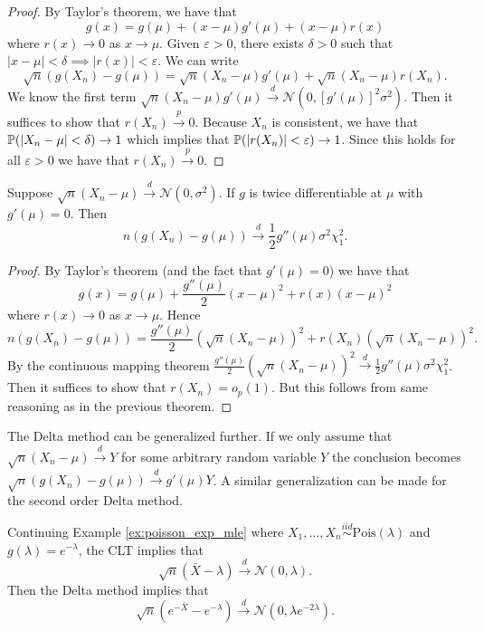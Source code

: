 \begin{proof}
	By Taylor's theorem, we have that \[
	g(x) = g(\mu) + (x - \mu)g'(\mu) + (x - \mu)r(x)
	\] where $r(x) \to 0$ as $x \to \mu$. Given $\varepsilon > 0$, there exists $\delta > 0$ such that $|x - \mu| < \delta \implies |r(x)| < \varepsilon$. We can write \[
	\sqrt{n}(g(X_n) - g(\mu)) = \sqrt{n}(X_n - \mu)g'(\mu) + \sqrt{n}(X_n - \mu)r(X_n).
	\] We know the first term $\sqrt{n}(X_n - \mu)g'(\mu) \overset{d}{\to} \mathcal{N}(0, [g'(\mu)]^2 \sigma^2)$. Then it suffices to show that $r(X_n) \overset{p}{\to} 0$. Because $X_n$ is consistent, we have that $\mathbb{P}(|X_n - \mu| < \delta) \to 1$ which implies that $\mathbb{P}(|r(X_n)| < \varepsilon) \to 1$. Since this holds for all $\varepsilon > 0$ we have that $r(X_n) \overset{p}{\to} 0$.
\end{proof}

\begin{theorem}
	Suppose $\sqrt{n}(X_n - \mu) \overset{d}{\to} \mathcal{N}(0, \sigma^2)$. If $g$ is twice differentiable at $\mu$ with $g'(\mu) = 0$. Then \[
	n(g(X_n) - g(\mu)) \overset{d}{\to} \frac{1}{2} g''(\mu) \sigma^2 \chi^2_1.
	\]
\end{theorem}

\begin{proof}
By Taylor's theorem (and the fact that $g'(\mu) = 0$) we have that \[
g(x) = g(\mu) + \frac{g''(\mu)}{2}(x - \mu)^2  + r(x) (x - \mu)^2  
\] where $r(x) \to 0$ as $x \to \mu$. Hence \[
	n(g(X_n) - g(\mu)) = \frac{g''(\mu)}{2} (\sqrt{n}(X_n - \mu))^2 + r(X_n) (\sqrt{n}(X_n - \mu))^2.
\] By the continuous mapping theorem $\frac{g''(\mu)}{2} (\sqrt{n}(X_n - \mu))^2 \overset{d}{\to}  \frac{1}{2} g''(\mu) \sigma^2 \chi^2_1$. Then it suffices to show that $r(X_n) = o_p(1)$. But this follows from same reasoning as in the previous theorem.
\end{proof}

\begin{remark}
	The Delta method can be generalized further. If we only assume that $\sqrt{n} (X_n - \mu) \overset{d}{\to} Y$ for some arbitrary random variable $Y$ the conclusion becomes\\ $\sqrt{n}(g(X_n) - g(\mu)) \overset{d}{\to} g'(\mu) Y$. A similar generalization can be made for the second order Delta method.
\end{remark}

\begin{example}
	Continuing Example \ref{ex:poisson_exp_mle} where $X_1, \dots, X_n \overset{iid}{\sim} \text{Pois}(\lambda)$ and $g(\lambda) = e^{-\lambda}$, the CLT implies that \[
		\sqrt{n} (\bar X - \lambda) \overset{d}{\to} \mathcal{N}(0, \lambda).
	\] Then the Delta method implies that \[
		\sqrt{n} (e^{-\bar X} - e^{-\lambda}) \overset{d}{\to} \mathcal{N}(0, \lambda e^{-2\lambda}).
	\]
\end{example}

